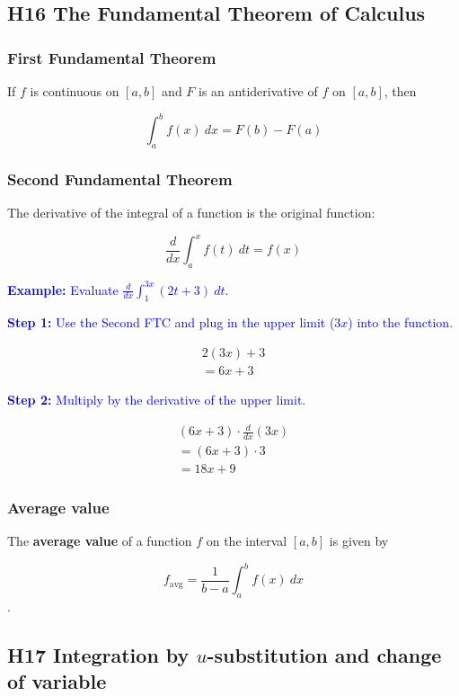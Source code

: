 \documentclass[letterpaper, 12pt]{article}
\newcommand{\example}[1]{\textcolor{blue}{\textbf{Example:} #1}}
\newcommand{\step}[2]{\textcolor{blue}{\textbf{Step #1:} #2}}
\begin{document}
\subsection*{H16 The Fundamental Theorem of Calculus}

\subsubsection*{First Fundamental Theorem}

If $f$ is continuous on $[a, b]$ and $F$ is an antiderivative of $f$ on $[a, b]$, then

$$\int_{a}^{b} f(x) \: dx = F(b) - F(a)$$

\subsubsection*{Second Fundamental Theorem}

The derivative of the integral of a function is the original function:

$$\frac{d}{dx} \int_{a}^{x} f(t) \: dt = f(x)$$

\example{Evaluate $\displaystyle \frac{d}{dx} \int_{1}^{3x} (2t + 3) \: dt$.}

\step{1}{Use the Second FTC and plug in the upper limit ($3x$) into the function.}

\begin{gather*}
2(3x)+3 \\
= 6x + 3
\end{gather*}

\step{2}{Multiply by the derivative of the upper limit.}

\begin{gather*}
(6x + 3) \cdot \frac{d}{dx}(3x) \\
= (6x + 3) \cdot 3 \\
= \boxed{18x + 9}
\end{gather*}

\subsubsection*{Average value}

The \textbf{average value} of a function $f$ on the interval $[a, b]$ is given by

$$f_{\text{avg}} = \frac{1}{b - a} \int_{a}^{b} f(x) \: dx$$.

\subsection*{H17 Integration by $u$-substitution and change of variable}
\end{document}
